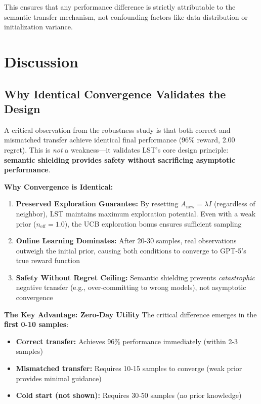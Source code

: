 \documentclass[sigconf,nonacm]{acmart}
\begin{document}
This ensures that any performance difference is strictly attributable to the semantic transfer mechanism, not confounding factors like data distribution or initialization variance.

\section{Discussion}

\subsection{Why Identical Convergence Validates the Design}

A critical observation from the robustness study is that both correct and mismatched transfer achieve identical final performance (96\% reward, 2.00 regret). This is \textit{not} a weakness—it validates LST's core design principle: \textbf{semantic shielding provides safety without sacrificing asymptotic performance}.

\textbf{Why Convergence is Identical:}
\begin{enumerate}
    \item \textbf{Preserved Exploration Guarantee:} By resetting $A_{\text{new}} = \lambda I$ (regardless of neighbor), LST maintains maximum exploration potential. Even with a weak prior ($n_{\text{eff}} = 1.0$), the UCB exploration bonus ensures sufficient sampling
    \item \textbf{Online Learning Dominates:} After 20-30 samples, real observations outweigh the initial prior, causing both conditions to converge to GPT-5's true reward function
    \item \textbf{Safety Without Regret Ceiling:} Semantic shielding prevents \textit{catastrophic} negative transfer (e.g., over-committing to wrong models), not asymptotic convergence
\end{enumerate}

\textbf{The Key Advantage: Zero-Day Utility}
The critical difference emerges in the \textbf{first 0-10 samples}:
\begin{itemize}
    \item \textbf{Correct transfer:} Achieves 96\% performance immediately (within 2-3 samples)
    \item \textbf{Mismatched transfer:} Requires 10-15 samples to converge (weak prior provides minimal guidance)
    \item \textbf{Cold start (not shown):} Requires 30-50 samples (no prior knowledge)
\end{itemize}
\end{document}
